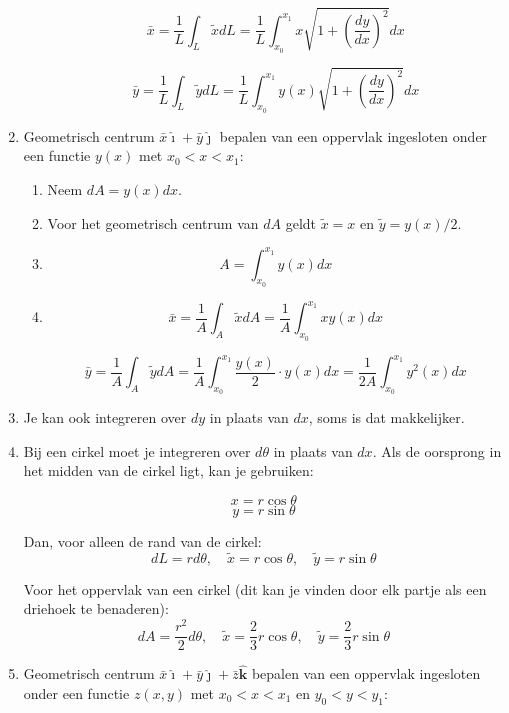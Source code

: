 \documentclass{article}
\renewcommand{\u}[1]{\hat{\bm{#1}}}
\renewcommand{\i}{\hat{\bm{\imath}}}
\renewcommand{\j}{\hat{\bm{\jmath}}}
\renewcommand{\k}{\u{k}}
\begin{document}
\begin{enumerate}
\begin{enumerate}
$$\bar{x} = \frac{1}{L}\int_L \tilde{x} dL = \frac{1}{L}\int_{x_0}^{x_1} x \sqrt{1+\left(\frac{dy}{dx}\right)^2} dx$$

$$\bar{y} = \frac{1}{L}\int_L \tilde{y} dL = \frac{1}{L}\int_{x_0}^{x_1} y(x) \sqrt{1+\left(\frac{dy}{dx}\right)^2} dx$$
\end{enumerate}

\item Geometrisch centrum $\bar{x}\i+\bar{y}\j$ bepalen van een oppervlak ingesloten onder een functie $y(x)$ met $x_0 < x < x_1$:

\begin{enumerate}
    \item Neem $dA = y(x) dx$.
    \item Voor het geometrisch centrum van $dA$ geldt $\tilde{x}= x$ en $\tilde{y}= y(x)/2$.
    \item

   $$ A = \int_{x_0}^{x_1} y(x) dx$$

    \item 

$$\bar{x} = \frac{1}{A}\int_A \tilde{x} dA = \frac{1}{A}\int_{x_0}^{x_1} xy(x)dx$$

$$\bar{y} = \frac{1}{A}\int_A \tilde{y} dA = \frac{1}{A}\int_{x_0}^{x_1} \frac{y(x)}{2}\cdot y(x)dx = \frac{1}{2A}\int_{x_0}^{x_1} y^2(x)dx$$

\end{enumerate}

\item Je kan ook integreren over $dy$ in plaats van $dx$, soms is dat makkelijker.



\item Bij een cirkel moet je integreren over $d\theta$ in plaats van $dx$. Als de oorsprong in het midden van de cirkel ligt, kan je gebruiken: 

$$x = r\cos\theta$$
$$y = r\sin\theta$$

Dan, voor alleen de rand van de cirkel:
$$dL = r d\theta,\quad \tilde{x}=r\cos\theta,\quad \tilde{y}=r\sin\theta$$

Voor het oppervlak van een cirkel (dit kan je vinden door elk partje als een driehoek te benaderen):
$$dA = \frac{r^2}{2} d\theta,\quad \tilde{x}=\frac{2}{3}r\cos\theta,\quad \tilde{y}=\frac{2}{3}r\sin\theta$$

\item Geometrisch centrum $\bar{x}\i+\bar{y}\j+\bar{z}\k$ bepalen van een oppervlak ingesloten onder een functie $z(x, y)$ met $x_0 < x < x_1$ en $y_0 < y < y_1$:


\end{enumerate}
\end{document}
